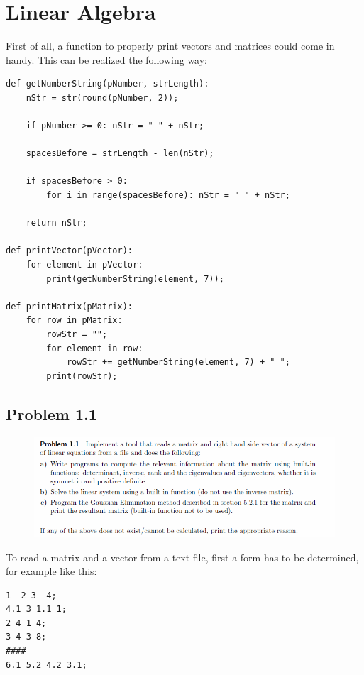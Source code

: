 \section{Linear Algebra}

First of all, a function to properly print vectors and matrices could come in handy. This can be realized the following way:

\begin{lstlisting}[caption=Functions to properly print vectors and matrices]
def getNumberString(pNumber, strLength):
	nStr = str(round(pNumber, 2));
	
	if pNumber >= 0: nStr = " " + nStr;
	
	spacesBefore = strLength - len(nStr);
	
	if spacesBefore > 0:
		for i in range(spacesBefore): nStr = " " + nStr;
	
	return nStr;

def printVector(pVector):
    for element in pVector:
		print(getNumberString(element, 7));

def printMatrix(pMatrix):
	for row in pMatrix:
		rowStr = "";
		for element in row:
			rowStr += getNumberString(element, 7) + " ";
		print(rowStr);
\end{lstlisting}


\subsection{Problem 1.1}


\begin{figure}[!ht]
\includegraphics[width=1\textwidth]{chapters/images/desc-1-1}
\end{figure}


To read a matrix and a vector from a text file, first a form has to be determined, for example like this:

\begin{lstlisting}
1 -2 3 -4;
4.1 3 1.1 1;
2 4 1 4;
3 4 3 8;
####
6.1 5.2 4.2 3.1;
\end{lstlisting}


